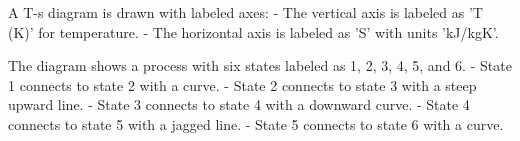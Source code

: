 A T-s diagram is drawn with labeled axes:  
- The vertical axis is labeled as 'T (K)' for temperature.  
- The horizontal axis is labeled as 'S' with units 'kJ/kgK'.  

The diagram shows a process with six states labeled as 1, 2, 3, 4, 5, and 6.  
- State 1 connects to state 2 with a curve.  
- State 2 connects to state 3 with a steep upward line.  
- State 3 connects to state 4 with a downward curve.  
- State 4 connects to state 5 with a jagged line.  
- State 5 connects to state 6 with a curve.
